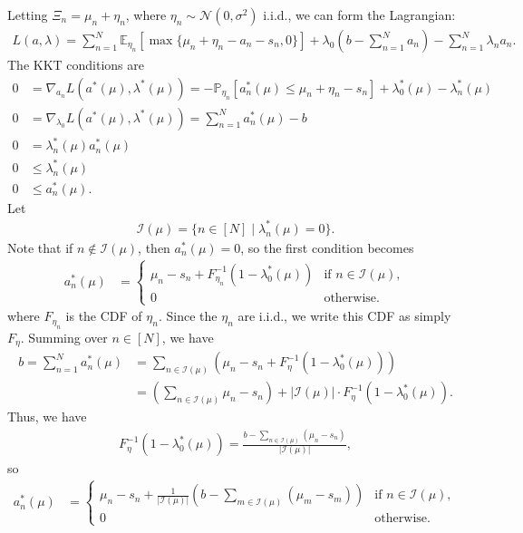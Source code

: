 \documentclass[12pt]{article}
\begin{document}
Letting $\Xi_n=\mu_n+\eta_n$, where $\eta_n\sim\mathcal{N}(0,\sigma^2)$ i.i.d., we can form the Lagrangian:
\begin{align*}
L(a,\lambda) = \sum_{n=1}^{N} \mathbb{E}_{\eta_n} \left[ \max \{\mu_n + \eta_n - a_n - s_n, 0\} \right] + \lambda_0\left( b - \sum_{n=1}^{N} a_n \right) - \sum_{n=1}^N\lambda_n a_n.
\end{align*}
The KKT conditions are
\begin{align*}
0 &= \nabla_{a_n} L(a^*(\mu),\lambda^*(\mu))
= -\mathbb{P}_{\eta_n} \left[ a^*_n(\mu) \leq \mu_n + \eta_n - s_n \right] + \lambda_0^*(\mu) - \lambda_n^*(\mu) \\
0 &= \nabla_{\lambda_0} L(a^*(\mu),\lambda^*(\mu)) = \sum_{n=1}^{N} a^*_n(\mu) - b \\
0 &= \lambda_n^*(\mu)a^*_n(\mu) \\
0 &\le \lambda_n^*(\mu) \\
0 &\le a^*_n(\mu).
\end{align*}
Let
\begin{align*}
\mathcal{I}(\mu) = \{ n \in [N] \mid \lambda_n^*(\mu) = 0 \}.
\end{align*}
Note that if $n\not\in\mathcal{I}(\mu)$, then $a_n^*(\mu)=0$, so the first condition becomes
\begin{align*}
a_n^*(\mu) &=
\begin{cases}
\mu_n - s_n + F_{\eta_n}^{-1}(1 - \lambda_0^*(\mu)) &\text{if }n \in \mathcal{I}(\mu), \\
0&\text{otherwise}.
\end{cases}
\end{align*}
where $F_{\eta_n}$ is the CDF of $\eta_n$. Since the $\eta_n$ are i.i.d., we write this CDF as simply $F_\eta$. Summing over $n\in[N]$, we have
\begin{align*}
b = \sum_{n=1}^N a_n^*(\mu)
&= \sum_{n\in\mathcal{I}(\mu)} \left(\mu_n - s_n + F_\eta^{-1}(1 - \lambda_0^*(\mu))\right) \\
&= \left(\sum_{n\in\mathcal{I}(\mu)}\mu_n - s_n\right) + |\mathcal{I}(\mu)|\cdot F_\eta^{-1}(1 - \lambda_0^*(\mu)).
\end{align*}
Thus, we have
\begin{align*}
F_\eta^{-1}(1 - \lambda_0^*(\mu)) = \frac{b - \sum_{n\in\mathcal{I}(\mu)}(\mu_n - s_n)}{|\mathcal{I}(\mu)|},
\end{align*}
so
\begin{align*}
a_n^*(\mu) &=
\begin{cases}
\mu_n - s_n + \frac{1}{|\mathcal{I}(\mu)|}\left(b - \sum_{m\in\mathcal{I}(\mu)}(\mu_m - s_m)\right) &\text{if }n \in \mathcal{I}(\mu), \\
0&\text{otherwise}.
\end{cases}
\end{align*}
\end{document}
